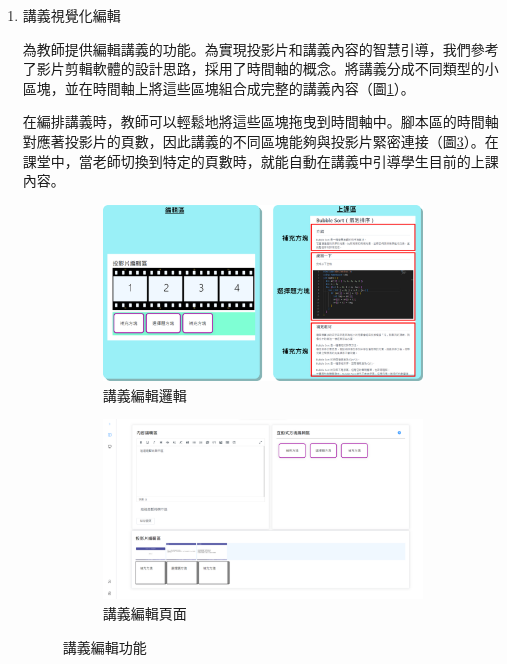 \begin{enumerate}
  \item 講義視覺化編輯
  \par 為教師提供編輯講義的功能。為實現投影片和講義內容的智慧引導，我們參考了影片剪輯軟體的設計思路，採用了時間軸的概念。將講義分成不同類型的小區塊，並在時間軸上將這些區塊組合成完整的講義內容（圖\ref{fig:edit}）。
  \par 在編排講義時，教師可以輕鬆地將這些區塊拖曳到時間軸中。腳本區的時間軸對應著投影片的頁數，因此講義的不同區塊能夠與投影片緊密連接（圖\ref{fig:time}）。在課堂中，當老師切換到特定的頁數時，就能自動在講義中引導學生目前的上課內容。

  \begin{figure}[H]
    \begin{subfigure}{0.5\linewidth}
      \centering
      \includegraphics[width=1\textwidth]{images/timezone.png}
      \caption{講義編輯邏輯}
      \label{fig:edit}
    \end{subfigure}
    \begin{subfigure}{0.5\linewidth}
      \centering
      \includegraphics[width=1\textwidth]{images/edit.png}
      \caption{講義編輯頁面}
      \label{fig:time}
    \end{subfigure}
    \caption{講義編輯功能}
  \end{figure}

\end{enumerate}

